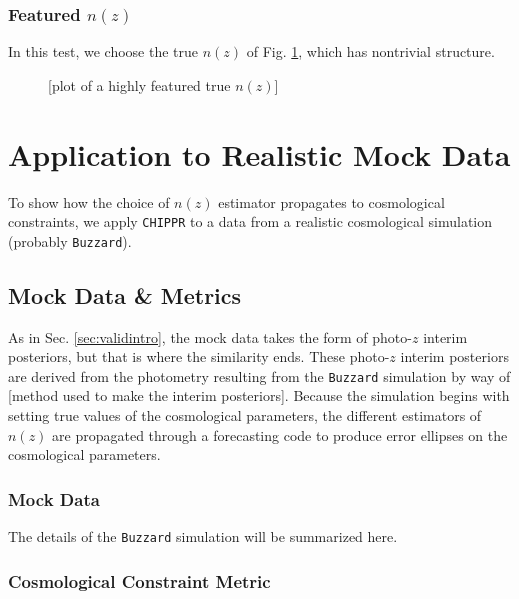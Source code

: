 \documentclass[iop]{emulateapj}
\newcommand{\chippr}{\texttt{CHIPPR} }
\begin{document}
\subsubsection{Featured $n(z)$}
\label{sec:featured}

In this test, we choose the true $n(z)$ of Fig. \ref{fig:featured}, which has 
nontrivial structure.

\begin{figure}
	\begin{center}
		\caption{[plot of a highly featured true $n(z)$]}
		\label{fig:featured}
	\end{center}
\end{figure}

\section{Application to Realistic Mock Data}
\label{sec:application}

To show how the choice of $n(z)$ estimator propagates to cosmological 
constraints, we apply \chippr to a data from a realistic cosmological 
simulation (probably \texttt{Buzzard}).

\subsection{Mock Data \& Metrics}
\label{sec:appintro}

As in Sec. \ref{sec:validintro}, the mock data takes the form of photo-$z$ 
interim posteriors, but that is where the similarity ends.  These photo-$z$ 
interim posteriors are derived from the photometry resulting from the 
\texttt{Buzzard} simulation by way of [method used to make the interim 
posteriors].  Because the simulation begins with setting true values of the 
cosmological parameters, the different estimators of $n(z)$ are propagated 
through a forecasting code to produce error ellipses on the cosmological 
parameters.

\subsubsection{Mock Data}
\label{sec:buzzard}

The details of the \texttt{Buzzard} simulation will be summarized here.

\subsubsection{Cosmological Constraint Metric}
\label{sec:cosmo}
\end{document}
